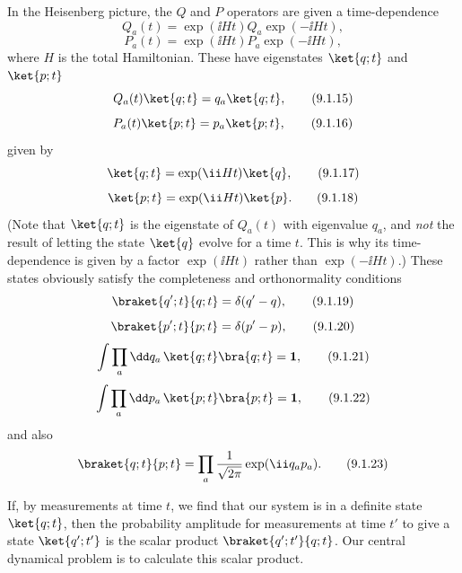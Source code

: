 In the Heisenberg picture, the $Q$ and $P$ operators are given a
time-dependence
\begin{equation}
  Q_a(t)=\exp(\ii Ht)Q_a\exp(-\ii Ht),
  \tag{9.1.13}\label{eq:9.1.13}
\end{equation}
\begin{equation}
  P_a(t)=\exp(\ii Ht)P_a\exp(-\ii Ht),
  \tag{9.1.14}\label{eq:9.1.14}
\end{equation}
where $H$ is the total Hamiltonian. These have eigenstates $\ket{q;t}$ and
$\ket{p;t}$
\begin{equation}
  Q_a(t)\ket{q;t}=q_a\ket{q;t},
  \tag{9.1.15}\label{eq:9.1.15}
\end{equation}
\begin{equation}
  P_a(t)\ket{p;t}=p_a\ket{p;t},
  \tag{9.1.16}\label{eq:9.1.16}
\end{equation}
given by
\begin{equation}
  \ket{q;t}=\exp(\ii Ht)\ket{q},
  \tag{9.1.17}\label{eq:9.1.17}
\end{equation}
\begin{equation}
  \ket{p;t}=\exp(\ii Ht)\ket{p}.
  \tag{9.1.18}\label{eq:9.1.18}
\end{equation}
(Note that $\ket{q;t}$ is the eigenstate of $Q_a(t)$ with eigenvalue $q_a$,
and \emph{not} the result of letting the state $\ket{q}$ evolve for a time
$t$. This is why its time-dependence is given by a factor $\exp(\ii Ht)$ rather
than $\exp(-\ii Ht)$.) These states obviously satisfy the completeness and
orthonormality conditions
\begin{equation}
  \braket{q';t}{q;t}=\delta(q'-q),
  \tag{9.1.19}\label{eq:9.1.19}
\end{equation}
\begin{equation}
  \braket{p';t}{p;t}=\delta(p'-p),
  \tag{9.1.20}\label{eq:9.1.20}
\end{equation}
\begin{equation}
  \int\prod_a \dd q_a\,\ket{q;t}\bra{q;t}=\mathbf{1},
  \tag{9.1.21}\label{eq:9.1.21}
\end{equation}
\begin{equation}
  \int\prod_a \dd p_a\,\ket{p;t}\bra{p;t}=\mathbf{1},
  \tag{9.1.22}\label{eq:9.1.22}
\end{equation}
and also
\begin{equation}
  \braket{q;t}{p;t}=\prod_a\frac{1}{\sqrt{2\pi}}\exp(\ii q_ap_a).
  \tag{9.1.23}\label{eq:9.1.23}
\end{equation}

If, by measurements at time $t$, we find that our system is in a definite
state $\ket{q;t}$, then the probability amplitude for measurements at time
$t'$ to give a state $\ket{q';t'}$ is the scalar product
$\braket{q';t'}{q;t}$. Our central dynamical problem is to calculate this
scalar product.

